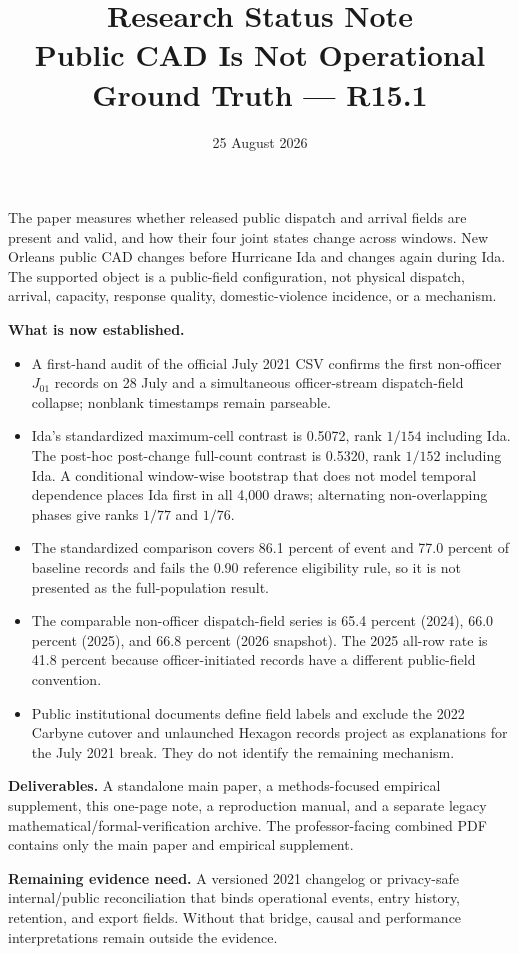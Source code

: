 \documentclass[10pt]{article}
\title{\vspace{-2.2em}\textbf{Research Status Note}\\[0.25em]
\large Public CAD Is Not Operational Ground Truth --- R15.1}
\author{}
\date{25 August 2026}
\begin{document}
\maketitle
\thispagestyle{plain}
\vspace{-1.9em}

\begin{plainbox}[title=Current result]
The paper measures whether released public dispatch and arrival fields are present and valid, and how their four joint states change across windows. New Orleans public CAD changes before Hurricane Ida and changes again during Ida. The supported object is a public-field configuration, not physical dispatch, arrival, capacity, response quality, domestic-violence incidence, or a mechanism.
\end{plainbox}

\noindent\textbf{What is now established.}
\begin{itemize}
\item A first-hand audit of the official July 2021 CSV confirms the first non-officer $J_{01}$ records on 28 July and a simultaneous officer-stream dispatch-field collapse; nonblank timestamps remain parseable.
\item Ida's standardized maximum-cell contrast is 0.5072, rank $1/154$ including Ida. The post-hoc post-change full-count contrast is 0.5320, rank $1/152$ including Ida. A conditional window-wise bootstrap that does not model temporal dependence places Ida first in all 4,000 draws; alternating non-overlapping phases give ranks $1/77$ and $1/76$.
\item The standardized comparison covers 86.1 percent of event and 77.0 percent of baseline records and fails the 0.90 reference eligibility rule, so it is not presented as the full-population result.
\item The comparable non-officer dispatch-field series is 65.4 percent (2024), 66.0 percent (2025), and 66.8 percent (2026 snapshot). The 2025 all-row rate is 41.8 percent because officer-initiated records have a different public-field convention.
\item Public institutional documents define field labels and exclude the 2022 Carbyne cutover and unlaunched Hexagon records project as explanations for the July 2021 break. They do not identify the remaining mechanism.
\end{itemize}

\noindent\textbf{Deliverables.} A standalone main paper, a methods-focused empirical supplement, this one-page note, a reproduction manual, and a separate legacy mathematical/formal-verification archive. The professor-facing combined PDF contains only the main paper and empirical supplement.

\noindent\textbf{Remaining evidence need.} A versioned 2021 changelog or privacy-safe internal/public reconciliation that binds operational events, entry history, retention, and export fields. Without that bridge, causal and performance interpretations remain outside the evidence.
\end{document}
